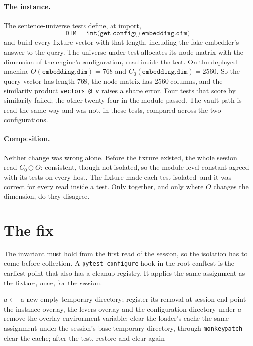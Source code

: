 \documentclass[11pt]{article}
\theoremstyle{plain}
\theoremstyle{definition}
\theoremstyle{remark}
\newcommand{\code}[1]{\texttt{#1}}
\begin{document}
\paragraph{The instance.} The sentence-universe tests define, at import,
\[ \code{DIM = int(get\_config().embedding.dim)} \]
and build every fixture vector with that length,
including the fake embedder's answer to the query. The universe under test allocates its
node matrix with the dimension of the engine's configuration, read inside the test. On the
deployed machine $O(\code{embedding.dim}) = 768$ and $C_0(\code{embedding.dim}) = 2560$. So the
query vector has length 768, the node matrix has 2560 columns, and the similarity product
\code{vectors @ v} raises a shape error. Four tests that score by similarity failed; the other
twenty-four in the module passed. The vault path is read the same way and was not, in these tests,
compared across the two configurations.

\paragraph{Composition.} Neither change was wrong alone. Before the fixture existed, the whole
session read $C_0 \oplus O$: consistent, though not isolated, so the module-level constant agreed
with its tests on every host. The fixture made each test isolated, and it was correct for every
read inside a test. Only together, and only where $O$ changes the dimension, do they disagree.

\section{The fix}\label{sec:fix}
The invariant must hold from the first read of the session, so the isolation has to come before
collection. A \code{pytest\_configure} hook in the root conftest is the earliest point that also
has a cleanup registry. It applies the same assignment as the fixture, once, for the session.

\begin{algorithm}
\caption{Session isolation before collection, and per-test isolation after it.}
\begin{algorithmic}[1]
  \State $a \gets$ a new empty temporary directory; register its removal at session end
  \State point the instance overlay, the levers overlay and the configuration directory under $a$
  \State remove the overlay environment variable; clear the loader's cache
\EndProcedure
{}
  \State the same assignment under the session's base temporary directory, through
         \code{monkeypatch}
  \State clear the cache; after the test, restore and clear again
\EndProcedure
\end{algorithmic}
\end{algorithm}
\end{document}
